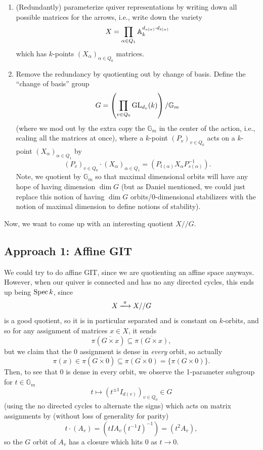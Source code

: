 \documentclass[12pt]{article}
\begin{document}
\begin{enumerate}
    \item (Redundantly) parameterize quiver representations by writing down all possible matrices for the arrows, i.e., write down the variety
    \[X = \prod_{\alpha\in Q_1} \mathbb{A}_k^{d_{s(\alpha)}\cdot d_{t(\alpha)}}\]
    which has $k$-points $(X_{\alpha})_{\alpha\in Q_0}$ matrices.
    \item Remove the redundancy by quotienting out by change of basis. Define the ``change of basis'' group
    \[G = \left(\prod_{v\in Q_0} \mathrm{GL}_{d_v}(k)\right) / \mathbb G_m\]
    (where we mod out by the extra copy the $\mathbb G_m$ in the center of the action, i.e., scaling all the matrices at once), where a $k$-point $(P_v)_{v\in Q_0}$ acts on a $k$-point $(X_\alpha)_{\alpha\in Q_1}$ by
    \[(P_v)_{v\in Q_0} \cdot (X_\alpha)_{\alpha\in Q_1} = (P_{t(\alpha)} X_\alpha P_{s(\alpha)}^{-1}).\]
    Note, we quotient by $\mathbb G_m$ so that maximal dimensional orbits will have any hope of having dimension $\dim G$ (but as Daniel mentioned, we could just replace this notion of having $\dim G$ orbits/0-dimensional stabilizers with the notion of maximal dimension to define notions of stability).
\end{enumerate}

Now, we want to come up with an interesting quotient $X//G$.

\subsection{Approach 1: Affine GIT}

We could try to do affine GIT, since we are quotienting an affine space anyways. However, when our quiver is connected and has no any directed cycles, this ends up being $\operatorname{Spec} k$, since
\[X \xlongrightarrow{\pi} X//G\]
is a good quotient, so it is in particular separated and is constant on $k$-orbits, and so for any assignment of matrices $x\in X$, it sends
\[\pi(\overline{G\times x}) \subseteq \overline{\pi(G\times x)},\]
but we claim that the $0$ assignment is dense in \textit{every} orbit, so actually
\[\pi(x) \in \pi(\overline{G\times 0}) \subseteq \overline{\pi(G\times 0)} = \{\pi(G\times 0)\}.\]
Then, to see that $0$ is dense in every orbit, we observe the 1-parameter subgroup for $t\in \mathbb G_m$
\[t \mapsto (t^{\pm 1} I_{d(v)})_{v\in Q_0} \in G\]
(using the no directed cycles to alternate the signs) which acts on matrix assignments by (without loss of generality for parity)
\[t\cdot (A_v) = (tI A_v (t^{-1}I)^{-1}) = (t^2 A_v),\]
so the $G$ orbit of $A_v$ has a closure which hits $0$ as $t\to 0$.
\end{document}
